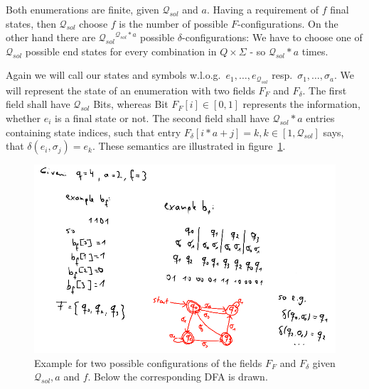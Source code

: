 
Both enumerations are finite, given $\mathcal{Q}_{sol}$ and $a$. Having a requirement of $f$ final states, then $\mathcal{Q}_{sol}$ choose $f$ is the number of possible $F$-configurations. On the other hand there are ${\mathcal{Q}_{sol}}^{\mathcal{Q}_{sol}*a}$ possible $\delta$-configurations: We have to choose one of $\mathcal{Q}_{sol}$ possible end states for every combination in $Q\times\Sigma$ - so $\mathcal{Q}_{sol}*a$ times.


Again we will call our states and symbols w.l.o.g.\ $e_1,\ldots,e_{\mathcal{Q}_{sol}}$ resp.\ $\sigma_1,\ldots,\sigma_a$. We will represent the state of an enumeration with two fields $F_F$ and $F_\delta$. The first field shall have $\mathcal{Q}_{sol}$ Bits, whereas Bit $F_F[i] \in [0,1]$ represents the information, whether $e_i$ is a final state or not. The second field shall have $\mathcal{Q}_{sol}*a$ entries containing state indices, such that entry $F_\delta[i * a + j] = k, k\in[1,\mathcal{Q}_{sol}]$ says, that $\delta(e_i, \sigma_j) = e_k$. These semantics are illustrated in figure~\ref{fig:dfa_enum_bit_fields}.


\begin{figure}
	\includegraphics[width=\linewidth]{images/dfa_enum_bit_fields.png}
	\caption{Example for two possible configurations of the fields $F_F$ and $F_\delta$ given $\mathcal{Q}_{sol}, a$ and $f$. Below the corresponding DFA is drawn.}
	\label{fig:dfa_enum_bit_fields}
\end{figure}


